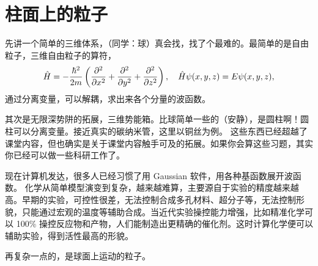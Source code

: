 \section{柱面上的粒子}
先讲一个简单的三维体系，（同学：球）真会找，找了个最难的。最简单的是自由粒子，三维自由粒子的算符，
\begin{align}
    \hat H = -\frac{\hbar^2}{2m} \left(\pdv[2]{x} + \pdv[2]{y} + \pdv[2]{z}\right), \quad \hat H \psi(x,y,z) = E \psi (x,y,z),
\end{align}
通过分离变量，可以解耦，求出来各个分量的波函数。

其次是无限深势阱的拓展，三维势能箱。比球简单一些的（安静），是圆柱啊！圆柱可以分离变量。接近真实的碳纳米管，这里以铜丝为例。
这些东西已经超越了课堂内容，但也确实是关于课堂内容触手可及的拓展。如果你会算这些习题，其实你已经可以做一些科研工作了。

现在计算机发达，很多人已经习惯了用 Gaussian 软件，用各种基函数展开波函数。
化学从简单模型演变到复杂，越来越难算，主要源自于实验的精度越来越高。早期的实验，可控性很差，无法控制合成多孔材料、超分子等，无法控制形貌，只能通过宏观的温度等辅助合成。当近代实验操控能力增强，比如精准化学可以 100\% 操控反应物和产物，人们能制造出更精确的催化剂。这时计算化学便可以辅助实验，得到活性最高的形貌。

再复杂一点的，是球面上运动的粒子。


